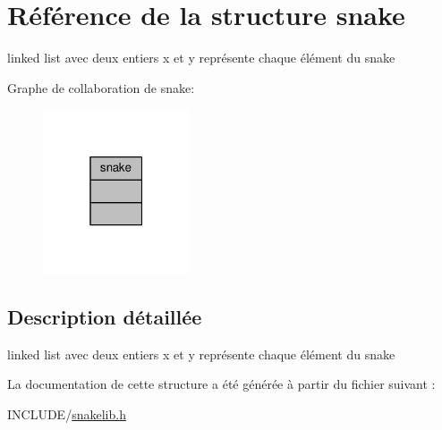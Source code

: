 \hypertarget{structsnake}{}\section{Référence de la structure snake}
\label{structsnake}


linked list avec deux entiers x et y représente chaque élément du snake  




Graphe de collaboration de snake\+:\nopagebreak
\begin{figure}[H]
\begin{center}
\leavevmode
\includegraphics[width=123pt]{structsnake__coll__graph}
\end{center}
\end{figure}


\subsection{Description détaillée}
linked list avec deux entiers x et y représente chaque élément du snake 

La documentation de cette structure a été générée à partir du fichier suivant \+:\begin{DoxyCompactItemize}
\item 
I\+N\+C\+L\+U\+D\+E/\hyperlink{snakelib_8h}{snakelib.\+h}\end{DoxyCompactItemize}
